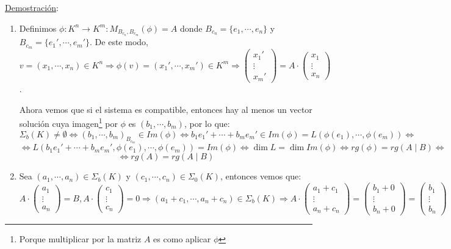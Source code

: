 \documentclass[10pt,a4paper,openright]{book}
\theoremstyle{break}
\begin{document}
\underline{Demostración}:
\begin{enumerate}
\item Definimos $\phi: K^n\longrightarrow K^m: M_{B_{c_n}, B_{c_m}}(\phi)=A$ donde $B_{c_n}=\{e_1, \cdots, e_n\}$ y $B_{c_m}=\{e_1', \cdots, e_m'\}$. De este modo, $v=(x_1, \cdots, x_n)\in K^n\Rightarrow \phi(v)=(x_1', \cdots, x_m')\in K^m\Rightarrow \begin{pmatrix}
x_1' \\ \vdots \\ x_m'
\end{pmatrix}=A\cdot \begin{pmatrix}
x_1 \\ \vdots \\ x_n
\end{pmatrix}$.

Ahora vemos que si el sistema es compatible, entonces hay al menos un vector solución cuya imagen\footnote{Porque multiplicar por la matriz $A$ es como aplicar $\phi$} por $\phi$ es $(b_1, \cdots, b_m)$, por lo que:
$$\Sigma_b(K)\neq \emptyset \Leftrightarrow (b_1, \cdots, b_m)_{B_{c_m}}\in Im(\phi)\Leftrightarrow b_1e_1'+\cdots+b_me_m'\in Im(\phi)=L\left(\phi(e_1), \cdots, \phi(e_m)\right)\Leftrightarrow $$
$$\Leftrightarrow L\left(b_1e_1'+\cdots+b_me_m',\phi(e_1), \cdots, \phi(e_m)\right)=Im(\phi)\Leftrightarrow \dim L=\dim Im(\phi)\Leftrightarrow rg(\phi)=rg(A\mid B)\Leftrightarrow$$
$$\Leftrightarrow rg(A)=rg(A\mid B)$$

\item Sea $(a_1, \cdots, a_n)\in \Sigma_b(K)$ y $(c_1, \cdots, c_n)\in \Sigma_0(K)$, entonces vemos que:
$$A\cdot \begin{pmatrix}
a_1 \\ \vdots \\ a_n
\end{pmatrix}=B, A\cdot \begin{pmatrix}
c_1 \\ \vdots \\ c_n
\end{pmatrix}=0 \Rightarrow (a_1+c_1, \cdots, a_n+c_n)\in \Sigma_b(K)\Rightarrow A\cdot \begin{pmatrix}
a_1+c_1 \\ \vdots \\ a_n+c_n
\end{pmatrix}=\begin{pmatrix}
b_1+0 \\ \vdots \\ b_n+0
\end{pmatrix}=\begin{pmatrix}
b_1 \\ \vdots \\ b_n
\end{pmatrix}$$
\end{enumerate}
\end{document}
